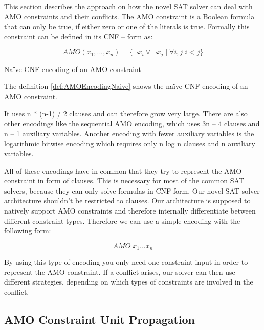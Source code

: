 This section describes the approach on how the novel SAT solver can deal with AMO constraints and their conflicts. The AMO constraint is a Boolean formula that can only be true, if either zero or one of the literals is true.  Formally this constraint can be defined in its CNF – form as:

\begin{definition}
\begin{leftbar}
\begin{displaymath}
AMO(x_1, ..., x_n)= \{\neg x_i \vee \neg x_j \; | \; \forall i, j \; i < j\}
\end{displaymath}
\end{leftbar}
\caption{Naïve CNF encoding of an AMO constraint}
\label{def:AMOEncodingNaive}
\end{definition}

The definition \ref{def:AMOEncodingNaive} shows the naïve CNF encoding of an AMO constraint. 

It uses n * (n-1) / 2 clauses and can therefore grow very large. There are also other encodings like the sequential AMO encoding, which uses 3n – 4 clauses and n – 1 auxiliary variables. Another encoding with fewer auxiliary variables is the logarithmic bitwise encoding which requires only n log n clauses and n auxiliary variables. 
\cite{chen2010new} 

All of these encodings have in common that they try to represent the AMO constraint in form of clauses. This is necessary for most of the common SAT solvers, because they can only solve formulas in CNF form. Our novel SAT solver architecture shouldn’t be restricted to clauses. Our architecture is supposed to natively support AMO constraints and therefore internally differentiate between different constraint types. Therefore we can use a simple encoding with the following form:

\begin{leftbar}
\begin{displaymath}
AMO \; x_1 ... x_n
\end{displaymath}
\end{leftbar}
By using this type of encoding you only need one constraint input in order to represent the AMO constraint. If a conflict arises, our solver can then use different strategies, depending on which types of constraints are involved in the conflict.

\subsection{AMO Constraint Unit Propagation}


